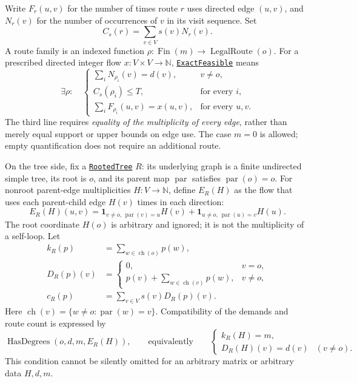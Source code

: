\documentclass[11pt]{article}
\theoremstyle{remark}
\newcommand{\N}{\mathbb N}
\newcommand{\pa}{\operatorname{par}}
\newcommand{\ch}{\operatorname{ch}}
\newcommand{\code}[1]{\nolinkurl{#1}}
\newcommand{\src}[2]{\href{https://github.com/huam54925-cpu/uav-routing-certification/blob/1bc992475a9bd515d77245e2bc0471e5ecab2fd5/LeanCompletion/UAV/#1.lean}{#2}}
\begin{document}
Write $F_r(u,v)$ for the number of times route $r$ uses directed edge $(u,v)$,
and $N_r(v)$ for the number of occurrences of $v$ in its visit sequence. Set
\[
  C_s(r)=\sum_{v\in V}s(v)N_r(v).
\]
A route family is an indexed function $\rho:\operatorname{Fin}(m)\to\operatorname{LegalRoute}(o)$.
For a prescribed directed integer flow $x:V\times V\to\N$,
\src{SupportExactFeasibility}{\code{ExactFeasible}} means
\begin{equation}\label{eq:exact}
 \exists\rho:\quad
 \begin{cases}
  \sum_i N_{\rho_i}(v)=d(v),&v\neq o,\\
  C_s(\rho_i)\leq T,&\text{for every }i,\\
  \sum_i F_{\rho_i}(u,v)=x(u,v),&\text{for every }u,v.
 \end{cases}
\end{equation}
The third line requires \emph{equality of the multiplicity of every edge}, rather than merely equal support or upper bounds on edge use.
The case $m=0$ is allowed; empty quantification does not require an additional route.

On the tree side, fix a \src{TreeFlowExistence}{\code{RootedTree}} $R$: its underlying graph is a finite undirected simple tree,
its root is $o$, and its parent map $\pa$ satisfies $\pa(o)=o$.
For nonroot parent-edge multiplicities $H:V\to\N$, define $E_R(H)$ as the flow that uses each parent-child edge $H(v)$ times in each direction:
\[
 E_R(H)(u,v)=
 \boldsymbol 1_{v\neq o,\,\pa(v)=u}H(v)
 +\boldsymbol 1_{u\neq o,\,\pa(u)=v}H(u).
\]
The root coordinate $H(o)$ is arbitrary and ignored; it is not the multiplicity of a self-loop.
Let
\begin{align}
 k_R(p)&=\sum_{w\in\ch(o)}p(w),\label{eq:rootcount}\\
 D_R(p)(v)&=
 \begin{cases}0,&v=o,\\p(v)+\sum_{w\in\ch(v)}p(w),&v\neq o,\end{cases}\label{eq:visits}\\
 c_R(p)&=\sum_{v\in V}s(v)D_R(p)(v).\label{eq:cost}
\end{align}
Here $\ch(v)=\{w\neq o:\pa(w)=v\}$.
Compatibility of the demands and route count is expressed by
\begin{equation}\label{eq:degrees}
 \operatorname{HasDegrees}(o,d,m,E_R(H)),
 \qquad\text{equivalently}\qquad
 \begin{cases}k_R(H)=m,\\D_R(H)(v)=d(v)&(v\neq o).\end{cases}
\end{equation}
This condition cannot be silently omitted for an arbitrary matrix or arbitrary data $H,d,m$.
\end{document}

